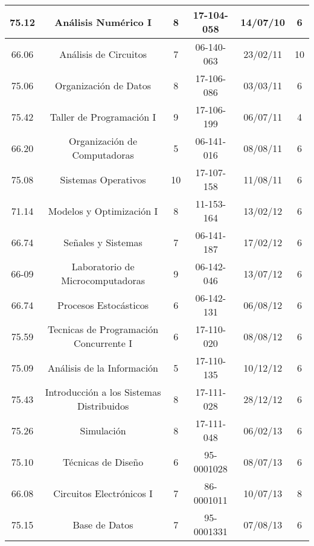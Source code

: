 \begin{center}
\begin{tabular}{|c|c|c|c|c|c|}
            \hline
            75.12 & Análisis Numérico I                        & 8  & 17-104-058 & 14/07/10 & 6 \\
            \hline
            66.06 & Análisis de Circuitos                      & 7  & 06-140-063 & 23/02/11 & 10 \\
            \hline
            75.06 & Organización de Datos                      & 8  & 17-106-086 & 03/03/11 & 6 \\
            \hline
            75.42 & Taller de Programación I                   & 9  & 17-106-199 & 06/07/11 & 4 \\
            \hline
            66.20 & Organización de Computadoras               & 5  & 06-141-016 & 08/08/11 & 6 \\
            \hline
            75.08 & Sistemas Operativos                        & 10 & 17-107-158 & 11/08/11 & 6 \\
            \hline 
            71.14 & Modelos y Optimización I                   & 8  & 11-153-164 & 13/02/12 & 6 \\
            \hline
            66.74 & Señales y Sistemas                         & 7  & 06-141-187 & 17/02/12 & 6 \\
            \hline
            66-09 & Laboratorio de Microcomputadoras           & 9  & 06-142-046 & 13/07/12 & 6 \\
            \hline
            66.74 & Procesos Estocásticos                      & 6  & 06-142-131 & 06/08/12 & 6 \\
            \hline
            75.59 & Tecnicas de Programación Concurrente I     & 6  & 17-110-020 & 08/08/12 & 6 \\
            \hline
            75.09 & Análisis de la Información                 & 5  & 17-110-135 & 10/12/12 & 6 \\
            \hline
            75.43 & Introducción a los Sistemas Distribuidos   & 8  & 17-111-028 & 28/12/12 & 6 \\
            \hline
            75.26 & Simulación                                 & 8  & 17-111-048 & 06/02/13 & 6 \\
            \hline
            75.10 & Técnicas de Diseño                         & 6  & 95-0001028 & 08/07/13 & 6 \\
            \hline
            66.08 & Circuitos Electrónicos I                   & 7  & 86-0001011 & 10/07/13 & 8 \\
            \hline
            75.15 & Base de Datos                              & 7  & 95-0001331 & 07/08/13 & 6 \\

\end{tabular}
\end{center}
